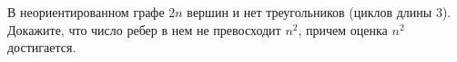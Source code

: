 В неориентированном графе $2n$ вершин и нет треугольников (циклов длины $3$). Докажите, что число ребер в нем не превосходит
$n^2$, причем оценка $n^2$ достигается.